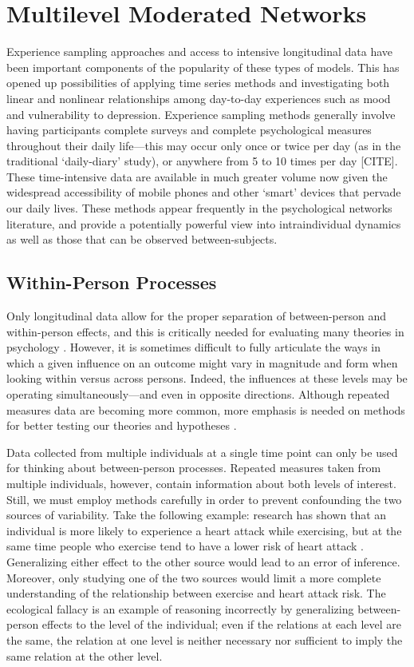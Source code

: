 \chapter{Multilevel Moderated Networks}
Experience sampling approaches and access to intensive longitudinal data have been important components of the popularity of these types of models. This has opened up possibilities of applying time series methods and investigating both linear and nonlinear relationships among day-to-day experiences such as mood and vulnerability to depression. Experience sampling methods generally involve having participants complete surveys and complete psychological measures throughout their daily life---this may occur only once or twice per day (as in the traditional `daily-diary' study), or anywhere from 5 to 10 times per day [CITE]. These time-intensive data are available in much greater volume now given the widespread accessibility of mobile phones and other `smart' devices that pervade our daily lives. These methods appear frequently in the psychological networks literature, and provide a potentially powerful view into intraindividual dynamics as well as those that can be observed between-subjects. 

\section{Within-Person Processes}
Only longitudinal data allow for the proper separation of between-person and within-person effects, and this is critically needed for evaluating many theories in psychology \cite{curran2011disaggregation}. However, it is sometimes difficult to fully articulate the ways in which a given influence on an outcome might vary in magnitude and form when looking within versus across persons. Indeed, the influences at these levels may be operating simultaneously---and even in opposite directions. Although repeated measures data are becoming more common, more emphasis is needed on methods for better testing our theories and hypotheses \cite{curran2011disaggregation}. 

Data collected from multiple individuals at a single time point can only be used for thinking about between-person processes. Repeated measures taken from multiple individuals, however, contain information about both levels of interest. Still, we must employ methods carefully in order to prevent confounding the two sources of variability. Take the following example: research has shown that an individual is more likely to experience a heart attack while exercising, but at the same time people who exercise tend to have a lower risk of heart attack \cite{curfman1993exercise,mittleman1993triggering}. Generalizing either effect to the other source would lead to an error of inference. Moreover, only studying one of the two sources would limit a more complete understanding of the relationship between exercise and heart attack risk. The ecological fallacy is an example of reasoning incorrectly by generalizing between-person effects to the level of the individual; even if the relations at each level are the same, the relation at one level is neither necessary nor sufficient to imply the same relation at the other level. 

